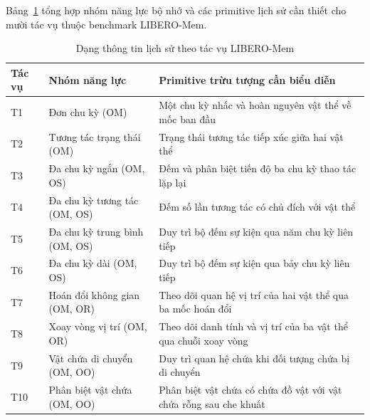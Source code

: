 Bảng~\ref{tab:app-memory-task-families} tổng hợp nhóm năng lực bộ nhớ và các primitive lịch sử cần thiết cho mười tác vụ thuộc benchmark LIBERO-Mem.

\begin{table}[htbp]
\centering\small
\caption{Dạng thông tin lịch sử theo tác vụ LIBERO-Mem}
\label{tab:app-memory-task-families}
\setlength{\tabcolsep}{5pt}
\renewcommand{\arraystretch}{1.12}
\begin{tabular}{|l|l|>{\raggedright\arraybackslash}p{7.5cm}|}
\hline
\textbf{Tác vụ} & \textbf{Nhóm năng lực} & \textbf{Primitive trừu tượng cần biểu diễn} \\ \hline
T1 & Đơn chu kỳ (OM) & Một chu kỳ nhấc và hoàn nguyên vật thể về mốc ban đầu \\ \hline
T2 & Tương tác trạng thái (OM) & Trạng thái tương tác tiếp xúc giữa hai vật thể \\ \hline
T3 & Đa chu kỳ ngắn (OM, OS) & Đếm và phân biệt tiến độ ba chu kỳ thao tác lặp lại \\ \hline
T4 & Đa chu kỳ tương tác (OM, OS) & Đếm số lần tương tác có chủ đích với vật thể \\ \hline
T5 & Đa chu kỳ trung bình (OM, OS) & Duy trì bộ đếm sự kiện qua năm chu kỳ liên tiếp \\ \hline
T6 & Đa chu kỳ dài (OM, OS) & Duy trì bộ đếm sự kiện qua bảy chu kỳ liên tiếp \\ \hline
T7 & Hoán đổi không gian (OM, OR) & Theo dõi quan hệ vị trí của hai vật thể qua ba mốc hoán đổi \\ \hline
T8 & Xoay vòng vị trí (OM, OR) & Theo dõi danh tính và vị trí của ba vật thể qua chuỗi xoay vòng \\ \hline
T9 & Vật chứa di chuyển (OM, OO) & Duy trì quan hệ chứa khi đối tượng chứa bị di chuyển \\ \hline
T10 & Phân biệt vật chứa (OM, OO) & Phân biệt vật chứa có chứa đồ vật với vật chứa rỗng sau che khuất \\ \hline
\end{tabular}
\end{table}
